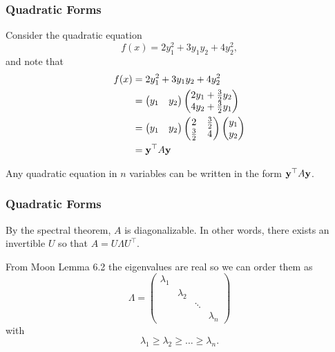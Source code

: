 \documentclass{beamer}
\begin{document}
\begin{frame}\frametitle{Quadratic Forms}
	\begin{example}
	Consider the quadratic equation
	\[
		f(x) = 2y_1^2 + 3 y_1 y_2 + 4 y_2^2,
	\]	
	and note that
	\begin{align*}
		f(x) 
			&= 2y_1^2 + 3 y_1 y_2 + 4 y_2^2 \\
		 	&= 	\begin{pmatrix}
 					y_1 & y_2 
 				\end{pmatrix}
 				\begin{pmatrix}
 					2y_1 + \frac{3}{2} y_2 \\
 					4y_2 + \frac{3}{2} y_1
 				\end{pmatrix} \\
 		 	&= 	\begin{pmatrix}
 					y_1 & y_2 
 				\end{pmatrix}
 				\begin{pmatrix}
 					2 & \frac{3}{2} \\
 					\frac{3}{2} & 4 
 				\end{pmatrix} 
 				\begin{pmatrix}
 					y_1 \\ y_2	
 				\end{pmatrix} \\
 			&= \mathbf{y}^\top A \mathbf{y}
	\end{align*}
	\end{example}
	
	Any quadratic equation in $n$ variables can be written in the form $\mathbf{y}^\top A \mathbf{y}$.
	
\end{frame}


\begin{frame}\frametitle{Quadratic Forms}
	By the spectral theorem, $A$ is diagonalizable.  In other words, there exists an invertible $U$ so that 
	$A = U\Lambda U^\top $.
	
	\vfill
	
	From Moon Lemma 6.2 the eigenvalues are real so we can order them as
	\[ 
		\Lambda 
			= \begin{pmatrix}
	    		\lambda_1\\
	    		& \lambda_2\\
	    		& & \ddots\\
	    		& & & \lambda_n
	  		   \end{pmatrix}
	\]
	with
	\[
	  	\lambda_1 \geq \lambda_2 \geq \ldots \geq \lambda_n.
	\]
\end{frame}
\end{document}
